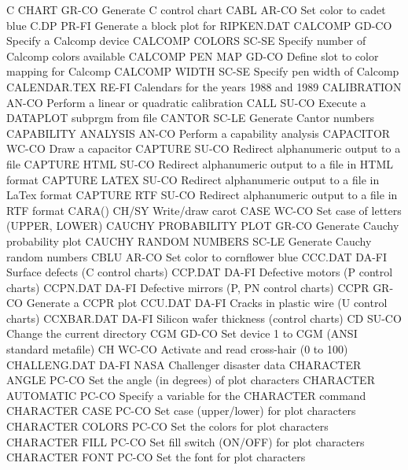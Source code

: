 C CHART                     GR-CO Generate C control chart
CABL                        AR-CO Set color to cadet blue
C.DP                        PR-FI Generate a block plot for RIPKEN.DAT
CALCOMP                     GD-CO Specify a Calcomp device
CALCOMP COLORS              SC-SE Specify number of Calcomp colors available
CALCOMP PEN MAP             GD-CO Define slot to color mapping for Calcomp
CALCOMP WIDTH               SC-SE Specify pen width of Calcomp
CALENDAR.TEX                RE-FI Calendars for the years 1988 and 1989
CALIBRATION                 AN-CO Perform a linear or quadratic calibration
CALL                        SU-CO Execute a DATAPLOT subprgm from file
CANTOR                      SC-LE Generate Cantor numbers
CAPABILITY ANALYSIS         AN-CO Perform a capability analysis
CAPACITOR                   WC-CO Draw a capacitor
CAPTURE                     SU-CO Redirect alphanumeric output to a file
CAPTURE HTML                SU-CO Redirect alphanumeric output to a file in HTML format
CAPTURE LATEX               SU-CO Redirect alphanumeric output to a file in LaTex format
CAPTURE RTF                 SU-CO Redirect alphanumeric output to a file in RTF format
CARA()                      CH/SY Write/draw carot
CASE                        WC-CO Set case of letters (UPPER, LOWER)
CAUCHY PROBABILITY PLOT     GR-CO Generate Cauchy probability plot
CAUCHY RANDOM NUMBERS       SC-LE Generate Cauchy random numbers
CBLU                        AR-CO Set color to cornflower blue
CCC.DAT                     DA-FI Surface defects (C control charts)
CCP.DAT                     DA-FI Defective motors (P control charts)
CCPN.DAT                    DA-FI Defective mirrors (P, PN control charts)
CCPR                        GR-CO Generate a CCPR plot 
CCU.DAT                     DA-FI Cracks in plastic wire (U control charts)
CCXBAR.DAT                  DA-FI Silicon wafer thickness (control charts)
CD                          SU-CO Change the current directory
CGM                         GD-CO Set device 1 to CGM (ANSI standard metafile)
CH                          WC-CO Activate and read cross-hair (0 to 100)
CHALLENG.DAT                DA-FI NASA Challenger disaster data 
CHARACTER ANGLE             PC-CO Set the angle (in degrees) of plot characters
CHARACTER AUTOMATIC         PC-CO Specify a variable for the CHARACTER command
CHARACTER CASE              PC-CO Set case (upper/lower) for plot characters
CHARACTER COLORS            PC-CO Set the colors for plot characters
CHARACTER FILL              PC-CO Set fill switch (ON/OFF) for plot characters
CHARACTER FONT              PC-CO Set the font for plot characters
